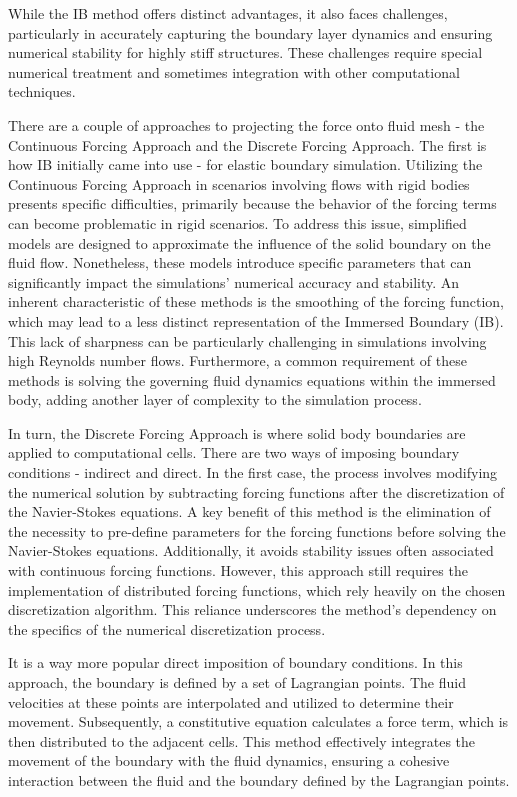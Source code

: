 While the IB method offers distinct advantages, it also faces challenges, particularly in accurately capturing the boundary layer dynamics and ensuring numerical stability for highly stiff structures. These challenges require special numerical treatment and sometimes integration with other computational techniques. 

There are a couple of approaches to projecting the force onto fluid mesh - the Continuous Forcing Approach and the Discrete Forcing Approach. The first is how IB initially came into use - for elastic boundary simulation. Utilizing the Continuous Forcing Approach in scenarios involving flows with rigid bodies presents specific difficulties, primarily because the behavior of the forcing terms can become problematic in rigid scenarios. To address this issue, simplified models are designed to approximate the influence of the solid boundary on the fluid flow. Nonetheless, these models introduce specific parameters that can significantly impact the simulations' numerical accuracy and stability. An inherent characteristic of these methods is the smoothing of the forcing function, which may lead to a less distinct representation of the Immersed Boundary (IB). This lack of sharpness can be particularly challenging in simulations involving high Reynolds number flows. Furthermore, a common requirement of these methods is solving the governing fluid dynamics equations within the immersed body, adding another layer of complexity to the simulation process. 

In turn, the Discrete Forcing Approach is where solid body boundaries are applied to computational cells. There are two ways of imposing boundary conditions - indirect and direct. In the first case, the process involves modifying the numerical solution by subtracting forcing functions after the discretization of the Navier-Stokes equations. A key benefit of this method is the elimination of the necessity to pre-define parameters for the forcing functions before solving the Navier-Stokes equations. Additionally, it avoids stability issues often associated with continuous forcing functions. However, this approach still requires the implementation of distributed forcing functions, which rely heavily on the chosen discretization algorithm. This reliance underscores the method's dependency on the specifics of the numerical discretization process.

It is a way more popular direct imposition of boundary conditions. In this approach, the boundary is defined by a set of Lagrangian points. The fluid velocities at these points are interpolated and utilized to determine their movement. Subsequently, a constitutive equation calculates a force term, which is then distributed to the adjacent cells. This method effectively integrates the movement of the boundary with the fluid dynamics, ensuring a cohesive interaction between the fluid and the boundary defined by the Lagrangian points. 


